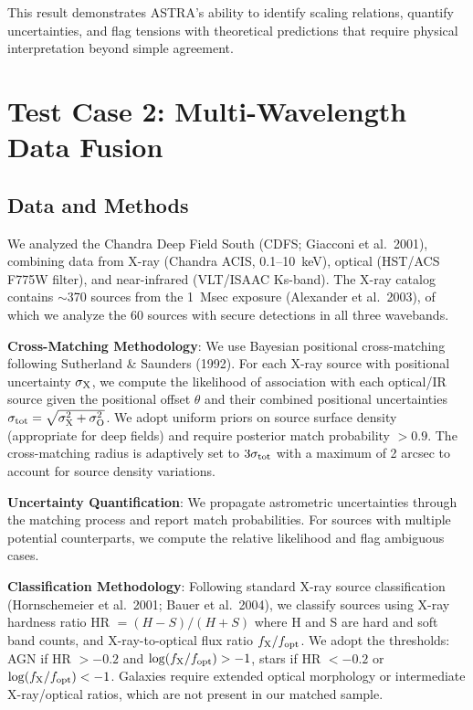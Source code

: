 \documentclass[usenatbib]{rasti}
\begin{document}
This result demonstrates ASTRA's ability to identify scaling relations, quantify uncertainties, and flag tensions with theoretical predictions that require physical interpretation beyond simple agreement.

\section{Test Case 2: Multi-Wavelength Data Fusion}

\subsection{Data and Methods}

We analyzed the Chandra Deep Field South (CDFS; Giacconi et al.~2001)\cite{giacconi2001}, combining data from X-ray (Chandra ACIS, 0.1--10~keV), optical (HST/ACS F775W filter), and near-infrared (VLT/ISAAC Ks-band). The X-ray catalog contains $\sim$370 sources from the 1~Msec exposure (Alexander et al.~2003)\cite{alexander2003}, of which we analyze the 60 sources with secure detections in all three wavebands.

\textbf{Cross-Matching Methodology}: We use Bayesian positional cross-matching following Sutherland \& Saunders (1992). For each X-ray source with positional uncertainty $\sigma_{\rm X}$, we compute the likelihood of association with each optical/IR source given the positional offset $\theta$ and their combined positional uncertainties $\sigma_{\rm tot} = \sqrt{\sigma_{\rm X}^2 + \sigma_{\rm O}^2}$. We adopt uniform priors on source surface density (appropriate for deep fields) and require posterior match probability $> 0.9$. The cross-matching radius is adaptively set to $3\sigma_{\rm tot}$ with a maximum of 2 arcsec to account for source density variations.

\textbf{Uncertainty Quantification}: We propagate astrometric uncertainties through the matching process and report match probabilities. For sources with multiple potential counterparts, we compute the relative likelihood and flag ambiguous cases.

\textbf{Classification Methodology}: Following standard X-ray source classification (Hornschemeier et al.~2001; Bauer et al.~2004)\cite{bauer2004}, we classify sources using X-ray hardness ratio HR $= (H-S)/(H+S)$ where H and S are hard and soft band counts, and X-ray-to-optical flux ratio $f_{\rm X}/f_{\rm opt}$. We adopt the thresholds: AGN if HR $> -0.2$ and $\log(f_{\rm X}/f_{\rm opt}) > -1$, stars if HR $< -0.2$ or $\log(f_{\rm X}/f_{\rm opt}) < -1$. Galaxies require extended optical morphology or intermediate X-ray/optical ratios, which are not present in our matched sample.
\end{document}
